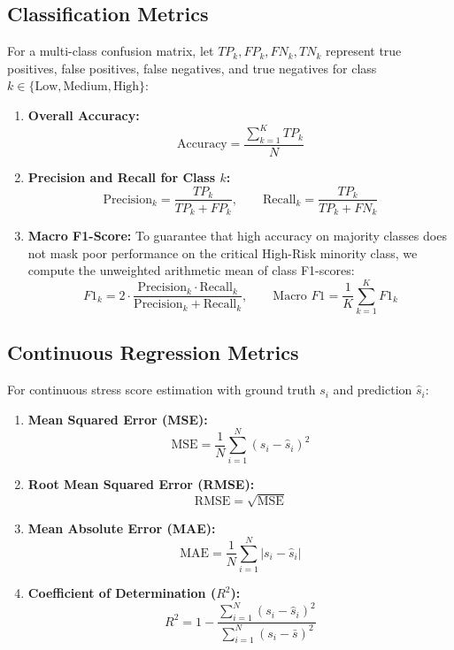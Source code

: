 \documentclass[12pt,a4paper,oneside]{report}
\begin{document}
\subsection{Classification Metrics}
For a multi-class confusion matrix, let $TP_k, FP_k, FN_k, TN_k$ represent true positives, false positives, false negatives, and true negatives for class $k \in \{\text{Low}, \text{Medium}, \text{High}\}$:
\begin{enumerate}
    \item \textbf{Overall Accuracy:}
    \begin{equation}
        \text{Accuracy} = \frac{\sum_{k=1}^K TP_k}{N}
    \end{equation}
    \item \textbf{Precision and Recall for Class $k$:}
    \begin{equation}
        \text{Precision}_k = \frac{TP_k}{TP_k + FP_k}, \qquad \text{Recall}_k = \frac{TP_k}{TP_k + FN_k}
    \end{equation}
    \item \textbf{Macro F1-Score:} To guarantee that high accuracy on majority classes does not mask poor performance on the critical High-Risk minority class, we compute the unweighted arithmetic mean of class F1-scores:
    \begin{equation}
        F1_k = 2 \cdot \frac{\text{Precision}_k \cdot \text{Recall}_k}{\text{Precision}_k + \text{Recall}_k}, \qquad \text{Macro } F1 = \frac{1}{K} \sum_{k=1}^K F1_k
        \label{eq:macro_f1}
    \end{equation}
\end{enumerate}

\subsection{Continuous Regression Metrics}
For continuous stress score estimation with ground truth $s_i$ and prediction $\hat{s}_i$:
\begin{enumerate}
    \item \textbf{Mean Squared Error (MSE):}
    \begin{equation}
        \text{MSE} = \frac{1}{N} \sum_{i=1}^N (s_i - \hat{s}_i)^2
    \end{equation}
    \item \textbf{Root Mean Squared Error (RMSE):}
    \begin{equation}
        \text{RMSE} = \sqrt{\text{MSE}}
    \end{equation}
    \item \textbf{Mean Absolute Error (MAE):}
    \begin{equation}
        \text{MAE} = \frac{1}{N} \sum_{i=1}^N |s_i - \hat{s}_i|
    \end{equation}
    \item \textbf{Coefficient of Determination ($R^2$):}
    \begin{equation}
        R^2 = 1 - \frac{\sum_{i=1}^N (s_i - \hat{s}_i)^2}{\sum_{i=1}^N (s_i - \bar{s})^2}
    \end{equation}
\end{enumerate}
\end{document}
